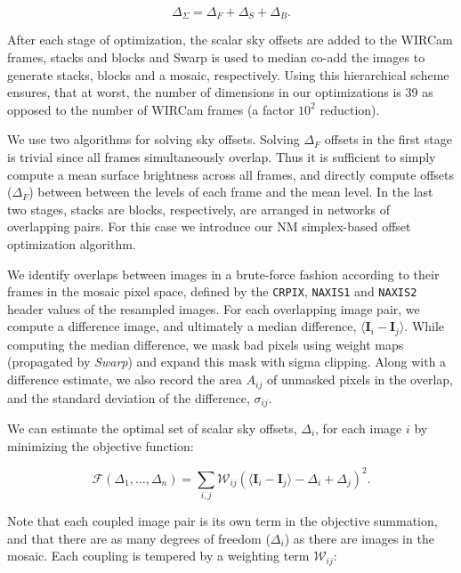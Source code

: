 \documentclass[iop,tighten]{emulateapj}
\newcommand{\vect}[1]{\boldsymbol{#1}} %
\newcommand{\sw}[1]{\textit{#1}} %
\begin{document}
\begin{equation}
  \Delta_\Sigma = \Delta_F + \Delta_S + \Delta_B.
  \label{eq:netoffset}
\end{equation}

\noindent After each stage of optimization, the scalar sky offsets are added to the WIRCam frames, stacks and blocks and Swarp is used to median co-add the images to generate stacks, blocks and a mosaic, respectively.
Using this hierarchical scheme ensures, that at worst, the number of dimensions in our optimizations is 39 as opposed to the number of WIRCam frames (a factor $10^2$ reduction).

We use two algorithms for solving sky offsets.
Solving $\Delta_F$ offsets in the first stage is trivial since all frames simultaneously overlap.
Thus it is sufficient to simply compute a mean surface brightness across all frames, and directly compute offsets ($\Delta_F$) between between the levels of each frame and the mean level.
In the last two stages, stacks are blocks, respectively, are arranged in networks of overlapping pairs.
For this case we introduce our NM simplex-based offset optimization algorithm.

We identify overlaps between images in a brute-force fashion according to their frames in the mosaic pixel space, defined by the \texttt{CRPIX}, \texttt{NAXIS1} and \texttt{NAXIS2} header values of the resampled images.
For each overlapping image pair, we compute a difference image, and ultimately a median difference, $\langle \vect{I}_i - \vect{I}_j \rangle$.
While computing the median difference, we mask bad pixels using weight maps (propagated by \sw{Swarp}) and expand this mask with sigma clipping.
Along with a difference estimate, we also record the area $A_{ij}$ of unmasked pixels in the overlap, and the standard deviation of the difference, $\sigma_{ij}$.

We can estimate the optimal set of scalar sky offsets, $\Delta_i$, for each image $i$ by minimizing the objective function:

\begin{equation}
    \mathcal{F} \left(\Delta_1,\ldots,\Delta_n \right) = \sum_{i,j} \mathcal{W}_{ij} \left( \langle \vect{I}_i - \vect{I}_j \rangle - \Delta_i + \Delta_j \right)^2.
    \label{eq:objf}
\end{equation}

\noindent Note that each coupled image pair is its own term in the objective summation, and that there are as many degrees of freedom ($\Delta_i$) as there are images in the mosaic.
Each coupling is tempered by a weighting term $\mathcal{W}_{ij}$:
\end{document}

